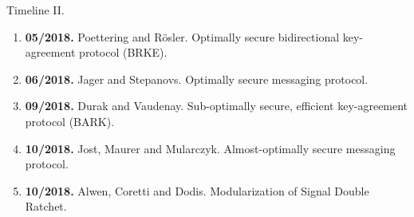 \documentclass{beamer}
\begin{document}
\begin{frame}{Timeline II.}
  \begin{enumerate}
  \item \textbf{05/2018.} Poettering and Rösler. Optimally secure bidirectional
    key-agreement protocol (BRKE).
  \item \textbf{06/2018.} Jager and Stepanovs. Optimally secure messaging protocol.
  \item \textbf{09/2018.} Durak and Vaudenay. Sub-optimally secure, efficient key-agreement
    protocol (BARK).
  \item \textbf{10/2018.} Jost, Maurer and Mularczyk. Almost-optimally secure messaging
    protocol.
  \item \textbf{10/2018.} Alwen, Coretti and Dodis. Modularization of Signal Double
    Ratchet.
  \end{enumerate}
\end{frame}


%       





\end{document}
